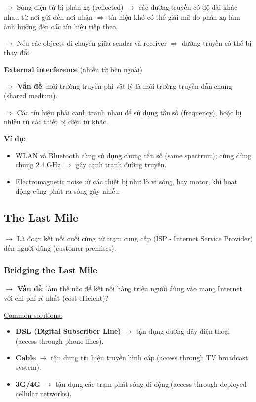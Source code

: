\noindent
$\rightarrow$ Sóng điện từ bị phản xạ (reflected) $\rightarrow$ các đường truyền có độ dài khác nhau từ nơi gửi đến nơi nhận $\Rightarrow$ tín hiệu khó có thể giải mã do phản xạ làm ảnh hưởng đến các tín hiệu tiếp theo.

$\rightarrow$ Nếu các objects di chuyển giữa sender và receiver $\Rightarrow$ đường truyền có thể bị thay đổi.
\medskip

\noindent
\textbf{External interference} (nhiễu từ bên ngoài)
\medskip

\noindent
\textbf{$\rightarrow$ Vấn đề:} môi trường truyền phi vật lý là môi trường truyền dẫn chung (shared medium).

$\Rightarrow$ Các tín hiệu phải cạnh tranh nhau để sử dụng tần số (frequency), hoặc bị nhiễu từ các thiết bị điện tử khác.
\medskip

\noindent
\textbf{Ví dụ:}

\begin{itemize}
    \item WLAN và Bluetooth cùng sử dụng chung tần số (same spectrum); cùng dùng chung 2.4 GHz $\Rightarrow$ gây cạnh tranh đường truyền.
    \item Electromagnetic noise từ các thiết bị như lò vi sóng, hay motor, khi hoạt động cũng phát ra sóng gây nhiễu.
\end{itemize}
\medskip
\noindent

\subsection{The Last Mile}

$\rightarrow$ Là đoạn kết nối cuối cùng từ trạm cung cấp (ISP - Internet Service Provider) đến người dùng (customer premises).
\medskip

\subsubsection{Bridging the Last Mile}

\noindent
\textbf{$\rightarrow$ Vấn đề:} làm thế nào để kết nối hàng triệu người dùng vào mạng Internet với chi phí rẻ nhất (cost-efficient)?
\medskip

\clearpage

\noindent
\underline{Common solutions:}

\begin{itemize}
    \item \textbf{DSL (Digital Subscriber Line)} $\rightarrow$ tận dụng đường dây điện thoại (access through phone lines).
    \item \textbf{Cable} $\rightarrow$ tận dụng tín hiệu truyền hình cáp (access through TV broadcast system).
    \item \textbf{3G/4G} $\rightarrow$ tận dụng các trạm phát sóng di động (access through deployed cellular networks).
\end{itemize}
\medskip

